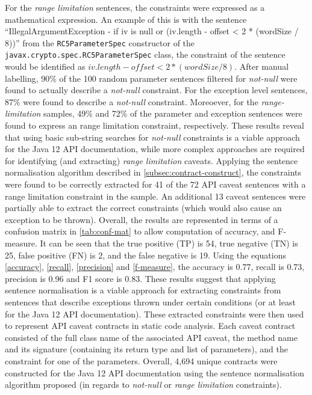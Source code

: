 For the \textit{range limitation} sentences, the constraints were expressed as a mathematical expression. An example of this is with the sentence ``IllegalArgumentException - if iv is null or (iv.length - offset < 2 * (wordSize / 8))'' from the \lstinline{RC5ParameterSpec} constructor of the \lstinline{javax.crypto.spec.RC5ParameterSpec} class, the constraint of the sentence would be identified as $iv.length-offset<2*(wordSize/8)$. After manual labelling, 90\% of the 100 random parameter sentences filtered for \textit{not-null} were found to actually describe a \textit{not-null} constraint. For the exception level sentences, 87\% were found to describe a \textit{not-null} constraint. Moreoever, for the \textit{range-limitation} samples, 49\% and 72\% of the parameter and exception sentences were found to express an range limitation constraint, respectively. These results reveal that using basic sub-string searches for \textit{not-null} constraints is a viable approach for the Java 12 API documentation, while more complex approaches are required for identifying (and extracting) \textit{range limitation} caveats. Applying the sentence normalisation algorithm described in \ref{subsec:contract-construct}, the constraints were found to be correctly extracted for 41 of the 72 API caveat sentences with a range limitation constraint in the sample. An additional 13 caveat sentences were partially able to extract the correct constraints (which would also cause an exception to be thrown). Overall, the results are represented in terms of a confusion matrix in \ref{tab:conf-mat} to allow computation of accuracy, and F-measure. It can be seen that the true positive (TP) is 54, true negative (TN) is 25, false positive (FN) is 2, and the false negative is 19. Using the equations \ref{accuracy}, \ref{recall}, \ref{precision} and \ref{f-measure}, the accuracy is 0.77, recall is 0.73, precision is 0.96 and F1 score is 0.83. These results suggest that applying sentence normalisation is a viable approach for extracting constraints from sentences that describe exceptions thrown under certain conditions (or at least for the Java 12 API documentation). These extracted constraints were then used to represent API caveat contracts in static code analysis. Each caveat contract consisted of the full class name of the associated API caveat, the method name and its signature (containing its return type and list of parameters), and the constraint for one of the parameters. Overall, 4,694 unique contracts were constructed for the Java 12 API documentation using the sentence normalisation algorithm proposed (in regards to \textit{not-null} or \textit{range limitation} constraints).

